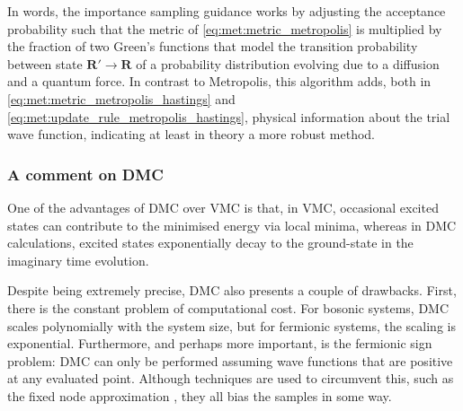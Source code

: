 In words, the importance sampling guidance works by adjusting the acceptance probability such that the metric of \eqref{eq:met:metric_metropolis} is multiplied by the fraction of two Green's functions that model the transition probability between state $\mathbf{R}' \to \mathbf{R}$ of a probability distribution evolving due to a diffusion and a quantum force. In contrast to Metropolis, this algorithm adds, both in \eqref{eq:met:metric_metropolis_hastings} and \eqref{eq:met:update_rule_metropolis_hastings}, physical information about the trial wave function, indicating at least in theory a more robust method.

\subsubsection{A comment on DMC}

One of the advantages of DMC over VMC is that, in VMC, occasional excited states can contribute to the minimised energy via local minima, whereas in DMC calculations, excited states exponentially decay to the ground-state in the imaginary time evolution.

Despite being extremely precise, DMC also presents a couple of drawbacks. First, there is the constant problem of computational cost. For bosonic systems, DMC scales polynomially with the system size, but for fermionic systems, the scaling is exponential. Furthermore, and perhaps more important, is the fermionic sign problem: DMC can only be performed assuming wave functions that are positive at any evaluated point. Although techniques are used to circumvent this, such as the fixed node approximation \cite{anderson1975random}, they all bias the samples in some way.
